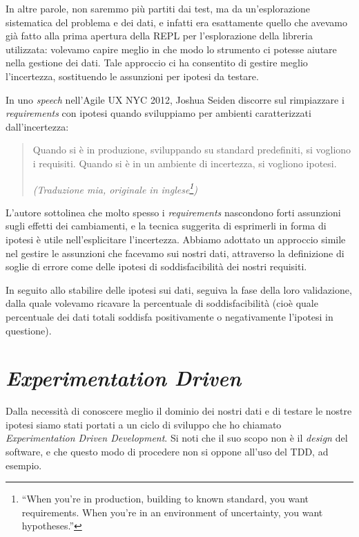 \documentclass[12pt]{report}
\begin{document}
In altre parole, non saremmo più partiti dai test, ma da un'esplorazione
sistematica del problema e dei dati, e infatti era esattamente quello che
avevamo già fatto alla prima apertura della REPL per l'esplorazione della
libreria utilizzata: volevamo capire meglio in che modo lo strumento ci
potesse aiutare nella gestione dei dati. Tale approccio ci ha consentito di
gestire meglio l'incertezza, sostituendo le assunzioni per ipotesi da testare.

In uno \textit{speech} nell'Agile UX NYC 2012, Joshua Seiden discorre
sul rimpiazzare i \textit{requirements} con ipotesi quando sviluppiamo
per ambienti caratterizzati dall'incertezza: 

\begin{quote}
Quando si è in produzione, sviluppando su standard predefiniti, si vogliono
i requisiti. Quando si è in un ambiente di incertezza, si vogliono
ipotesi.\cite{seiden2012}

\flushright
\textit{(Traduzione mia, originale in inglese\footnote{
``When you're in production, building to known standard, you want requirements. 
When you're in an environment of uncertainty, you want hypotheses.''
})
}
\end{quote}

L'autore sottolinea che molto spesso i \textit{requirements}
nascondono forti assunzioni sugli effetti dei cambiamenti, e la
tecnica suggerita di esprimerli in forma di ipotesi è utile nell'esplicitare
l'incertezza. Abbiamo adottato un approccio simile nel gestire le assunzioni
che facevamo sui nostri dati, attraverso la definizione di soglie di errore
come delle ipotesi di soddisfacibilità dei nostri requisiti.

In seguito allo stabilire delle ipotesi sui dati, seguiva la fase
della loro validazione, dalla quale volevamo ricavare la percentuale
di soddisfacibilità (cioè quale percentuale dei dati totali soddisfa
positivamente o negativamente l'ipotesi in questione).

\section{\textit{Experimentation Driven}}

Dalla necessità di conoscere meglio il dominio dei nostri dati e
di testare le nostre ipotesi siamo stati portati a un ciclo di sviluppo
che ho chiamato \textit{Experimentation Driven Development}. 
Si noti che il suo scopo non è il \textit{design} del software,
e che questo modo di procedere non si oppone all'uso del TDD, ad esempio. 
\end{document}
